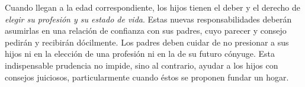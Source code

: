 	 Cuando llegan a la edad correspondiente, los hijos tienen el deber y el derecho de \emph{elegir su profesión y su estado de vida}. Estas nuevas responsabilidades deberán asumirlas en una relación de confianza con sus padres, cuyo parecer y consejo pedirán y recibirán dócilmente. Los padres deben cuidar de no presionar a sus hijos ni en la elección de una profesión ni en la de su futuro cónyuge. Esta indispensable prudencia no impide, sino al contrario, ayudar a los hijos con consejos juiciosos, particularmente cuando éstos se proponen fundar un hogar.